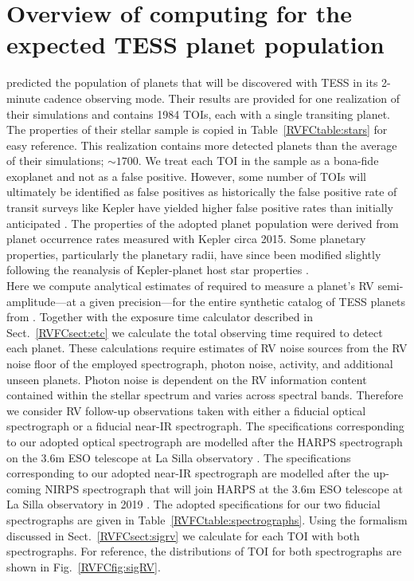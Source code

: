 \section{Overview of computing \nrv{} for the expected TESS planet population} \label{RVFCsect:simulation}
 predicted the population of planets that will be discovered with TESS in its
2-minute cadence observing mode. Their results are provided for one realization of their simulations
and contains 1984 TOIs, each with a single transiting planet. The properties of their stellar sample
is copied in Table~\ref{RVFCtable:stars} for easy reference. This realization contains more detected
planets than the average of their simulations; $\sim 1700$. We treat each TOI in the 
sample as a bona-fide exoplanet and not as a false positive. However, some number of TOIs will ultimately
be identified as false positives as historically the false positive rate of transit surveys like Kepler
have yielded higher false positive rates than initially anticipated \citep{sliski14,morton16}.
The properties of the adopted planet population
were derived from planet occurrence rates measured with Kepler circa 2015. Some planetary properties,
particularly the planetary radii, have since been modified slightly following
the reanalysis of Kepler-planet host star properties \citep[e.g.][]{fulton17}. \\

Here we compute analytical estimates of \nrv{}
required to measure a planet's RV semi-amplitude---at a given precision---for the entire synthetic catalog
of TESS planets from . Together with the exposure time calculator described in
Sect.~\ref{RVFCsect:etc} we calculate the total observing time required to detect each planet. These calculations
require estimates of RV noise sources from the RV noise floor of the employed spectrograph,
photon noise, activity, and additional unseen planets. Photon noise
is dependent on the RV information content contained within the stellar spectrum and varies across spectral
bands. Therefore we consider RV follow-up observations taken with either a fiducial optical spectrograph
or a fiducial near-IR spectrograph. The specifications corresponding to our adopted optical spectrograph are
modelled after the HARPS spectrograph on the 3.6m ESO telescope at La Silla
observatory \citep{mayor03}. The specifications corresponding to our adopted near-IR spectrograph
are modelled after the up-coming NIRPS spectrograph that will join HARPS at the 3.6m ESO
telescope at La Silla observatory in 2019 \citep{bouchy17}. The adopted specifications for our
two fiducial spectrographs are given in Table~\ref{RVFCtable:spectrographs}. Using the formalism discussed in
Sect.~\ref{RVFCsect:sigrv} we calculate \sigRV{} for each TOI with both spectrographs.
For reference, the distributions of TOI \sigRV{} for both spectrographs are shown in Fig.~\ref{RVFCfig:sigRV}. \\

